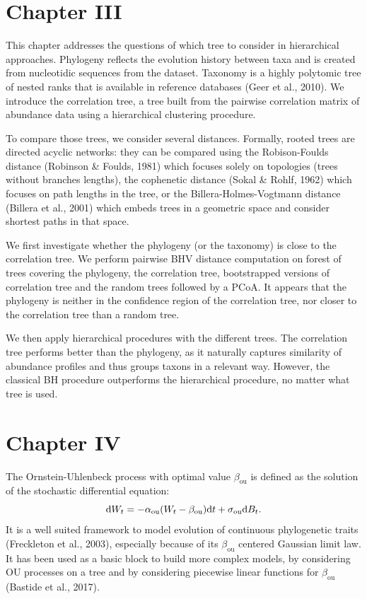 \documentclass[12pt,a4paper]{reedthesis}
\newcommand \dx [2] [] {\mathrm{d}^{#1}\mspace{-1mu}\mathord{#2}}
\newcommand \ou [1]{{#1}_{\text{ou}}}
\newcommand \optim {\beta}
\theoremstyle{definition}
\theoremstyle{definition}
\theoremstyle{definition}
\theoremstyle{remark}
\begin{document}
\hypertarget{chapter-iii}{%
\section*{Chapter III}\label{chapter-iii}}

This chapter addresses the questions of which tree to consider in hierarchical approaches. Phylogeny reflects the evolution history between taxa and is created from nucleotidic sequences from the dataset. Taxonomy is a highly polytomic tree of nested ranks that is available in reference databases (Geer et al., 2010). We introduce the correlation tree, a tree built from the pairwise correlation matrix of abundance data using a hierarchical clustering procedure.

To compare those trees, we consider several distances. Formally, rooted trees are directed acyclic networks: they can be compared using the Robison-Foulds distance (Robinson \& Foulds, 1981) which focuses solely on topologies (trees without branches lengths), the cophenetic distance (Sokal \& Rohlf, 1962) which focuses on path lengths in the tree, or the Billera-Holmes-Vogtmann distance (Billera et al., 2001) which embeds trees in a geometric space and consider shortest paths in that space.

We first investigate whether the phylogeny (or the taxonomy) is close to the correlation tree. We perform pairwise BHV distance computation on forest of trees covering the phylogeny, the correlation tree, bootstrapped versions of correlation tree and the random trees followed by a PCoA. It appears that the phylogeny is neither in the confidence region of the correlation tree, nor closer to the correlation tree than a random tree.

We then apply hierarchical procedures with the different trees. The correlation tree performs better than the phylogeny, as it naturally captures similarity of abundance profiles and thus groups taxons in a relevant way. However, the classical BH procedure outperforms the hierarchical procedure, no matter what tree is used.

\hypertarget{chapter-iv}{%
\section*{Chapter IV}\label{chapter-iv}}

The Ornstein-Uhlenbeck process with optimal value \(\ou{\optim}\) is defined as the solution of the stochastic differential equation:
\begin{equation*}
\dx{W_t} = - \ou{\alpha} (W_t - \ou{\optim}) \dx{t} + \ou{\sigma}\dx{B_t}.
\end{equation*}
It is a well suited framework to model evolution of continuous phylogenetic traits (Freckleton et al., 2003), especially because of its \(\ou{\optim}\) centered Gaussian limit law. It has been used as a basic block to build more complex models, by considering OU processes on a tree and by considering piecewise linear functions for \(\ou{\optim}\) (Bastide et al., 2017).
\end{document}
